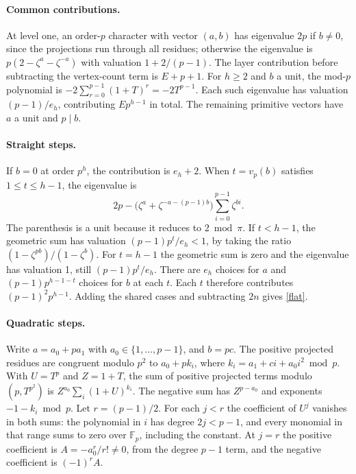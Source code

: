 \documentclass[11pt]{article}
\newcommand{\F}{\mathbb F}
\newcommand{\val}{v_p}
\begin{document}
\paragraph{Common contributions.}
At level one, an order-\(p\) character with vector \((a,b)\) has
eigenvalue \(2p\) if \(b\ne0\), since the projections run through all
residues; otherwise the eigenvalue is \(p(2-\zeta^a-\zeta^{-a})\)
with valuation \(1+2/(p-1)\). The layer contribution before subtracting
the vertex-count term is \(E+p+1\).
For \(h\ge2\) and \(b\) a unit, the mod-\(p\) polynomial is
\(-2\sum_{r=0}^{p-1}(1+T)^r=-2T^{p-1}\).
Each such eigenvalue has valuation \((p-1)/e_h\), contributing
\(E p^{h-1}\) in total. The remaining primitive vectors have \(a\) a
unit and \(p\mid b\).
\newpage
\paragraph{Straight steps.}
If \(b=0\) at order \(p^h\), the contribution is \(e_h+2\).
When \(t=\val(b)\) satisfies \(1\le t\le h-1\), the eigenvalue is
\[
 2p-\big(\zeta^a+\zeta^{-a-(p-1)b}\big)
       \sum_{i=0}^{p-1}\zeta^{bi}.
\]
The parenthesis is a unit because it reduces to \(2\bmod\pi\).
If \(t<h-1\), the geometric sum has valuation
\((p-1)p^t/e_h<1\), by taking the ratio
\((1-\zeta^{pb})/(1-\zeta^b)\).
For \(t=h-1\) the geometric sum is zero and the eigenvalue has
valuation 1, still \((p-1)p^t/e_h\). There are \(e_h\) choices for \(a\)
and \((p-1)p^{h-1-t}\) choices for \(b\) at each \(t\).
Each \(t\) therefore contributes \((p-1)^2p^{h-1}\).
Adding the shared cases and subtracting \(2n\) gives \eqref{flat}.

\paragraph{Quadratic steps.}
Write \(a=a_0+pa_1\) with \(a_0\in\{1,\ldots,p-1\}\), and \(b=pc\).
The positive projected residues are congruent modulo \(p^2\) to
\(a_0+p k_i\), where \(k_i=a_1+ci+a_0i^2\bmod p\).
With \(U=T^p\) and \(Z=1+T\), the sum of positive projected terms
modulo \((p,T^{p^2})\) is \(Z^{a_0}\sum_i(1+U)^{k_i}\).
The negative sum has \(Z^{p-a_0}\) and exponents \(-1-k_i\bmod p\).
Let \(r=(p-1)/2\). For each \(j<r\) the coefficient of \(U^j\)
vanishes in both sums: the polynomial in \(i\) has degree \(2j<p-1\),
and every monomial in that range sums to zero over \(\F_p\), including
the constant. At \(j=r\) the positive coefficient is
\(A=-a_0^r/r!\ne0\), from the degree \(p-1\) term, and the
negative coefficient is \((-1)^r A\).
\end{document}
